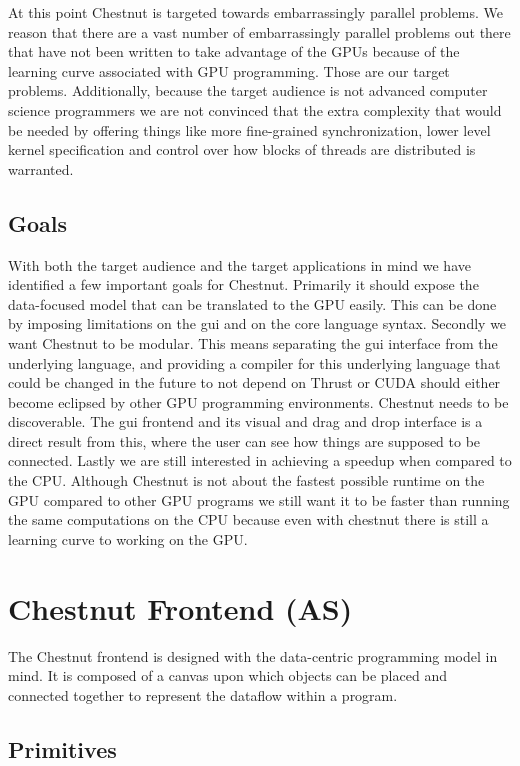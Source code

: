 \documentclass[twocolumn]{article}
\renewcommand{\|}{\origbar} %
\begin{document}
At this point Chestnut is targeted towards embarrassingly parallel problems. We reason that there are a vast number of embarrassingly parallel problems out there that have not been written to take advantage of the GPUs because of the learning curve associated with GPU programming. Those are our target problems. Additionally, because the target audience is not advanced computer science programmers we are not convinced that the extra complexity that would be needed by offering things like more fine-grained synchronization, lower level kernel specification and control over how blocks of threads are distributed is warranted.

\subsection{Goals}

With both the target audience and the target applications in mind we have identified a few important goals for Chestnut. Primarily it should expose the data-focused model that can be translated to the GPU easily. This can be done by imposing limitations on the gui and on the core language syntax. Secondly we want Chestnut to be modular. This means separating the gui interface from the underlying language, and providing a compiler for this underlying language that could be changed in the future to not depend on Thrust or CUDA should either become eclipsed by other GPU programming environments. Chestnut needs to be discoverable. The gui frontend and its visual and drag and drop interface is a direct result from this, where the user can see how things are supposed to be connected. Lastly we are still interested in achieving a speedup when compared to the CPU. Although Chestnut is not about the fastest possible runtime on the GPU compared to other GPU programs we still want it to be faster than running the same computations on the CPU because even with chestnut there is still a learning curve to working on the GPU.

\section{Chestnut Frontend (AS)}
\label{sec:chestnutFrontend}

The Chestnut frontend is designed with the data-centric programming model in mind. It is composed of a canvas upon which objects can be placed and connected together to represent the dataflow within a program.

\subsection{Primitives}
\end{document}
